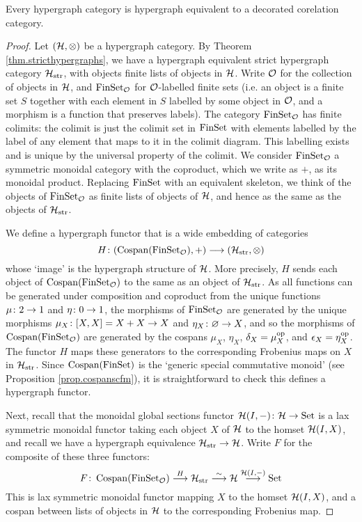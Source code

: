 \begin{theorem}\label{thm.hypdeccorcats}
  Every hypergraph category is hypergraph equivalent to a decorated corelation
  category.
\end{theorem}
\begin{proof}
  Let $(\mathcal H,\otimes)$ be a hypergraph category. By Theorem
  \ref{thm.stricthypergraphs}, we have a hypergraph equivalent strict hypergraph
  category $\mathcal H_{\mathrm{str}}$, with objects finite lists of objects in $\mathcal
  H$. Write $\mathcal O$ for the collection of objects in $\mathcal H$, and $\mathrm{FinSet}_{\mathcal
  O}$ for $\mathcal O$-labelled finite sets (i.e. an object is a finite set $S$
  together with each element in $S$ labelled by some object in $\mathcal O$, and a
  morphism is a function that preserves labels). The category $\mathrm{FinSet}_{\mathcal O}$
  has finite colimits: the colimit is just the colimit set in $\mathrm{FinSet}$ with
  elements labelled by the label of any element that maps to it in the colimit
  diagram. This labelling exists and is unique by the universal property of the
  colimit. We consider $\mathrm{FinSet}_{\mathcal O}$ a symmetric monoidal category with
  the coproduct, which we write as $+$, as its monoidal product.  Replacing
  $\mathrm{FinSet}$ with an equivalent skeleton, we think of the objects of
  $\mathrm{FinSet}_{\mathcal O}$ as finite lists of objects of $\mathcal H$, and hence as the same
  as the objects of $\mathcal H_{\mathrm{str}}$.

  We define a hypergraph functor that is a wide embedding of categories
  \[
    H{\colon} (\operatorname{{Cospan}}(\mathrm{FinSet}_{\mathcal O}),+) \longrightarrow (\mathcal
    H_{\mathrm{str}},\otimes)
  \]
  whose `image' is the hypergraph structure of $\mathcal H$. More precisely, $H$
  sends each object of $\operatorname{{Cospan}}(\mathrm{FinSet}_{\mathcal O})$ to the same as an object of
  $\mathcal H_{\mathrm{str}}$. As all functions can be generated under composition
  and coproduct from the unique functions $\mu {\colon} 2 \to 1$ and $\eta {\colon} 0
  \to 1$, the morphisms of $\mathrm{FinSet}_{\mathcal O}$ are generated by the unique
  morphisms $\mu_X{\colon} [X,X]=X+X \to X$ and $\eta_X{\colon} \varnothing \to X$,
  and so the morphisms of $\operatorname{{Cospan}}(\mathrm{FinSet}_{\mathcal O})$ are generated by the
  cospans $\mu_X$, $\eta_X$, $\delta_X = \mu_X^{\mathrm{op}}$, and $\epsilon_X =
  \eta_X^{\mathrm{op}}$. The functor $H$ maps these generators to the corresponding
  Frobenius maps on $X$ in $\mathcal H_{\mathrm{str}}$. Since $\operatorname{{Cospan}}(\mathrm{FinSet})$ is
  the `generic special commutative monoid' (see Proposition
  \ref{prop.cospanscfm}), it is straightforward to check this defines a
  hypergraph functor.

  Next, recall that the monoidal global sections functor $\mathcal H(I,-){\colon} \mathcal H
  \to \mathrm{Set}$ is a lax symmetric monoidal functor taking each object $X$ of $\mathcal
  H$ to the homset $\mathcal H(I,X)$, and recall we have a hypergraph equivalence
  $\mathcal H_{\mathrm{str}} \to \mathcal H$. Write $F$ for the composite of these three
  functors: 
  \[
    F{\colon} \operatorname{{Cospan}}(\mathrm{FinSet}_{\mathcal O}) \stackrel{H}\longrightarrow \mathcal
    H_{\mathrm{str}} \stackrel{\sim}\longrightarrow \mathcal H \stackrel{\mathcal
    H(I,-)}\longrightarrow \mathrm{Set}
  \]
  This is lax symmetric monoidal functor mapping $X$ to the homset $\mathcal H(I,X)$,
  and a cospan between lists of objects in $\mathcal H$ to the corresponding
  Frobenius map.


\end{proof}
